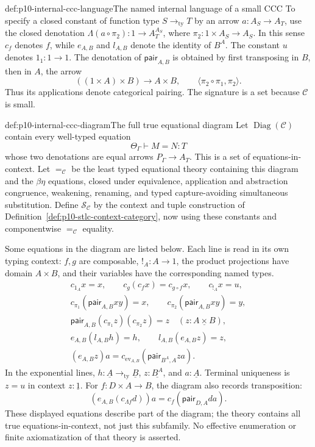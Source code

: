 \begin{hbdefinition}{def:p10-internal-ccc-language}{The named internal language of a small CCC}
To specify a closed constant of function type \(S\mathbin{\to_{\mathrm{ty}}}T\)
by an arrow \(a:A_S\to A_T\), use the closed denotation
\(\Lambda(a\circ\pi_2):1\to A_T^{A_S}\), where
\(\pi_2:1\times A_S\to A_S\).
In this sense \(c_f\) denotes \(f\), while \(e_{A,B}\) and
\(l_{A,B}\) denote the identity of \(B^A\).
The constant \(u\) denotes \(1_1:1\to1\).
The denotation of \(\mathsf{pair}_{A,B}\) is obtained by first
transposing in \(B\), then in \(A\), the arrow
\[
 ((1\times A)\times B)\longrightarrow A\times B,
 \qquad \langle\pi_2\circ\pi_1,\pi_2\rangle.
\]
Thus its applications denote categorical pairing.
The signature is a set because \(\mathcal C\) is small.
\end{hbdefinition}

\begin{hbdefinition}{def:p10-internal-ccc-diagram}{The full true equational diagram}
Let \(\operatorname{Diag}(\mathcal C)\) contain every well-typed equation
\[
 \Theta_\Gamma\vdash M=N:T
\]
whose two denotations are equal arrows \(P_\Gamma\to A_T\).
This is a set of equations-in-context.
Let \(=_{\mathcal C}\) be the least typed equational theory containing
this diagram and the \(\beta\eta\) equations, closed under equivalence,
application and abstraction congruence, weakening, renaming, and typed
capture-avoiding simultaneous substitution.
Define \(\mathcal S_{\mathcal C}\) by the context and tuple construction
of Definition~\ref{def:p10-stlc-context-category}, now using these
constants and componentwise \(=_{\mathcal C}\) equality.

Some equations in the diagram are listed below. Each line is read in
its own typing context: \(f,g\) are composable, \(!_A:A\to1\), the
product projections have domain \(A\times B\), and their variables
have the corresponding named types.
\[
\begin{gathered}
 c_{1_A}x=x,\qquad c_g(c_fx)=c_{g\circ f}x,\qquad c_{!_A}x=u,\\
 c_{\pi_1}(\mathsf{pair}_{A,B}xy)=x,\qquad
 c_{\pi_2}(\mathsf{pair}_{A,B}xy)=y,\\
 \mathsf{pair}_{A,B}(c_{\pi_1}z)(c_{\pi_2}z)=z
                     \quad(z:\underline{A\times B}),\\
 e_{A,B}(l_{A,B}h)=h,\qquad l_{A,B}(e_{A,B}z)=z,\\
 (e_{A,B}z)a
   =c_{\operatorname{ev}_{A,B}}(\mathsf{pair}_{B^A,A}za).
\end{gathered}
\]
In the exponential lines,
\(h:\underline A\mathbin{\to_{\mathrm{ty}}}\underline B\),
\(z:\underline{B^A}\), and \(a:\underline A\).
Terminal uniqueness is \(z=u\) in context \(z:\underline1\).
For \(f:D\times A\to B\), the diagram also records transposition:
\[
 (e_{A,B}(c_{\Lambda f}d))a
       =c_f(\mathsf{pair}_{D,A}da).
\]
These displayed equations describe part of the diagram; the theory
contains all true equations-in-context, not just this subfamily.
No effective enumeration or finite axiomatization of that theory is
asserted.
\end{hbdefinition}


